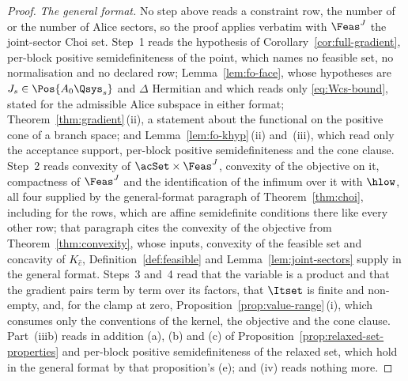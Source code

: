 \begin{proof}
\emph{The general format.} No step above reads a constraint row, the
number of  or the number of Alice
sectors, so the proof applies verbatim with $\Feas^{J}$ the joint-sector
Choi set. Step~1 reads the hypothesis of
Corollary~\ref{cor:full-gradient}, per-block positive semidefiniteness of
the point, which names no feasible set, no normalisation and no declared
row; Lemma~\ref{lem:fo-face}, whose hypotheses are
$J_s\in\Pos{A_0\Qsys_s}$ and $\Delta$ Hermitian and which reads only
\eqref{eq:Wcs-bound}, stated for the admissible Alice subspace in either
format; Theorem~\ref{thm:gradient}\,(ii), a statement about the functional
on the positive cone of a branch space; and
Lemma~\ref{lem:fo-khyp}\,(ii) and~(iii), which read only the acceptance
support, per-block positive semidefiniteness and the cone clause. Step~2
reads convexity of $\acSet\times\Feas^{J}$, convexity of the objective on
it, compactness of $\Feas^{J}$ and the identification of the infimum over
it with $\hlow$, all four supplied by the general-format paragraph of
Theorem~\ref{thm:choi}, including for the  rows, which are
affine semidefinite conditions there like every other row; that paragraph
cites the convexity of the objective from Theorem~\ref{thm:convexity},
whose inputs, convexity of the feasible set and concavity of $K_{\hat c}$,
Definition~\ref{def:feasible} and Lemma~\ref{lem:joint-sectors} supply in
the general format. Steps~3 and~4 read that the variable is a product and
that the gradient pairs term by term over its factors, that $\Itset$ is
finite and non-empty, and, for the clamp at zero,
Proposition~\ref{prop:value-range}\,(i), which consumes only the
conventions of the kernel, the objective and the cone clause. Part~(iiib)
reads in addition (a), (b) and (c) of
Proposition~\ref{prop:relaxed-set-properties} and per-block positive
semidefiniteness of the relaxed set, which hold in the general format by
that proposition's (e); and (iv) reads nothing more.
\end{proof}
